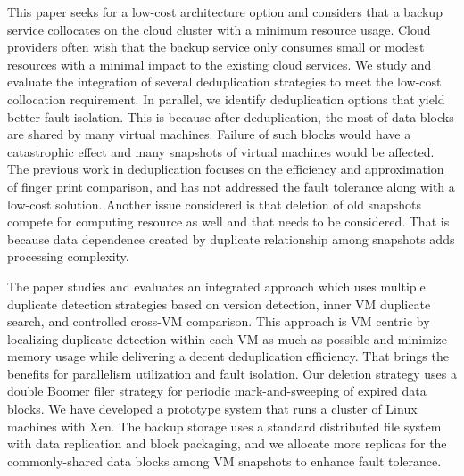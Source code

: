 This paper seeks for a low-cost architecture option and considers that
a backup service collocates  on  the cloud cluster with a minimum resource usage. 
Cloud providers often wish that the backup service only consumes  small or modest resources
with a minimal impact to the existing cloud services.  
We study and evaluate the integration of several deduplication strategies to meet
the low-cost collocation requirement. In parallel, we identify deduplication options that yield
better fault isolation.
This is because  after deduplication, the most of data blocks are shared by many virtual machines.
Failure of such blocks would  have a catastrophic effect and many snapshots of virtual machines would be affected.
The previous work in deduplication focuses on the efficiency and approximation of
finger print comparison, and has not addressed the  fault tolerance along with a low-cost solution.
Another issue considered is that
deletion of old snapshots compete for computing resource as well and that  needs
to be considered. That is  because data dependence created
by duplicate relationship among snapshots  adds processing complexity.

The paper studies and evaluates  an integrated approach which uses  multiple duplicate detection strategies
based on  version  detection, inner VM duplicate search,
and controlled cross-VM comparison. 
This approach is VM centric by localizing duplicate detection within each VM  as much as possible
and minimize memory usage while delivering a decent deduplication efficiency. 
That brings the benefits for parallelism  utilization and fault isolation.
Our deletion strategy uses a double Boomer filer strategy for periodic mark-and-sweeping of expired data blocks.
We have developed a prototype system that runs a cluster of Linux machines with Xen.
The backup storage uses a standard distributed file system  with data replication and block packaging,
and we allocate more  replicas for the commonly-shared  data blocks among VM snapshots to enhance fault tolerance.



